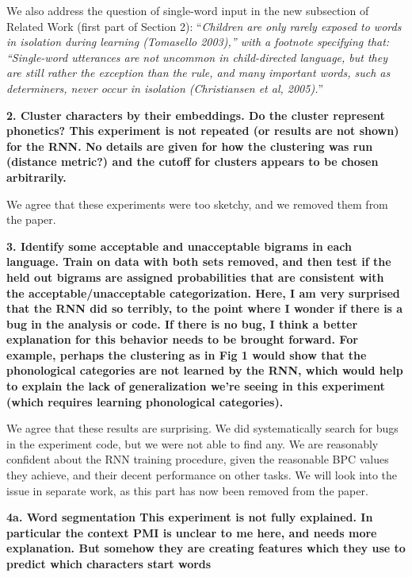 \documentclass{article}
\begin{document}
We also address the question of single-word input in the new subsection of Related Work (first part of Section 2): ``\textit{Children are only rarely exposed to words in isolation during learning (Tomasello 2003),'' with a footnote specifying that: ``Single-word utterances are not uncommon in child-directed language, but they are still rather the exception than the rule, and many important words, such as determiners, never occur in isolation (Christiansen et al, 2005).}''
\newline

\textbf{2. Cluster characters by their embeddings.  Do the cluster represent phonetics? This experiment is not repeated (or results are not shown) for the RNN.  No details are given for how the clustering was run (distance metric?) and the cutoff for clusters appears to be chosen arbitrarily.}

We agree that these experiments were too sketchy, and we removed them from the paper.
\newline

\textbf{3. Identify some acceptable and unacceptable bigrams in each language. Train on data with both sets removed, and then test if the held out bigrams
are assigned probabilities that are consistent with the acceptable/unacceptable categorization. Here, I am very surprised that the RNN did so terribly, to the point where I wonder if there is a bug in the analysis or code.  If there is no bug, I think a better explanation for this behavior needs to be brought forward. For example, perhaps the clustering as in Fig 1 would show that the phonological categories are not learned by the RNN, which would help to explain the lack of generalization we're seeing in this experiment (which requires learning phonological categories).}

We agree that these results are surprising. We did systematically search for bugs in the experiment code, but we were not able to find any. We are reasonably confident about the RNN training procedure, given the reasonable BPC values they achieve, and their decent performance on other tasks. We will look into the issue in separate work, as this part has now been removed from the paper.
\newline

\textbf{4a. Word segmentation This experiment is not fully explained.  In particular the context PMI is unclear to me here, and needs more explanation.  But somehow they are creating features which they use to predict which characters start words}
\end{document}
